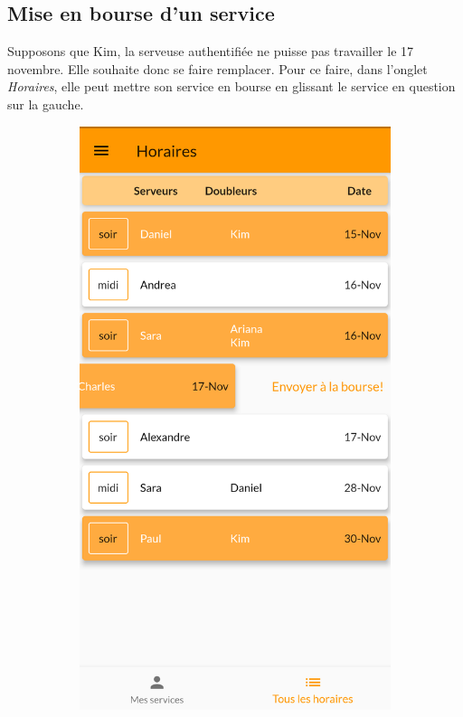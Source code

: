     \subsection*{Mise en bourse d'un service}
    Supposons que Kim, la serveuse authentifiée ne puisse pas travailler le 17 novembre.
    Elle souhaite donc se faire remplacer. Pour ce faire, dans l'onglet 
    \textit{Horaires}, elle peut mettre son service en bourse en glissant le 
    service en question sur la gauche.
    \begin{figure}[!h]
        \centering
        \begin{subfigure}{.3\textwidth}
            \centering
            \includegraphics[width=0.9\linewidth]{screenshots/scenario_02/mise_en_bourse.png}

\end{subfigure}
\end{figure}

